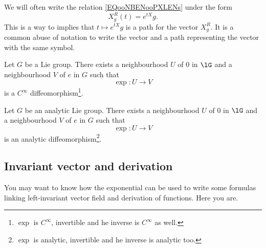 \begin{normaltext}      \label{NORMooSATDooIhwXXr}
    We will often write the relation \eqref{EQooNBENooPXLENs} under the form
    \begin{equation}
        X^R_g(t)= e^{tX}g.
    \end{equation}
    This is a way to implies that \( t\mapsto  e^{tX}g\) is a path for the vector \( X^R_g\). It is a common abuse of notation to write the vector and a path representing the vector with the same symbol.
\end{normaltext}

\begin{proposition}     \label{PROPooYFZZooLUOuOj}
    Let \( G\) be a Lie group. There exists a neighbourhood \( U\) of \( 0\) in \( \lG\) and a neighbourhood \( V\) of \( e\) in \( G\) such that
    \begin{equation}
        \exp\colon U\to V
    \end{equation}
    is a \(  C^{\infty}\) diffeomorphism\footnote{\( \exp\) is \(  C^{\infty}\), invertible and he inverse is \(  C^{\infty}\) as well.}.
\end{proposition}

\begin{proposition}     \label{PROPooAICDooQcmPZB}
    Let \( G\) be an analytic Lie group. There exists a neighbourhood \( U\) of \( 0\) in \( \lG\) and a neighbourhood \( V\) of \( e\) in \( G\) such that
    \begin{equation}
        \exp\colon U\to V
    \end{equation}
    is an analytic diffeomorphism\footnote{\( \exp\) is analytic, invertible and he inverse is analytic too.}.
\end{proposition}


\subsection{Invariant vector and derivation}

You may want to know how the exponential can be used to write some formulas linking left-invariant vector field and derivation of functions. Here you are.

